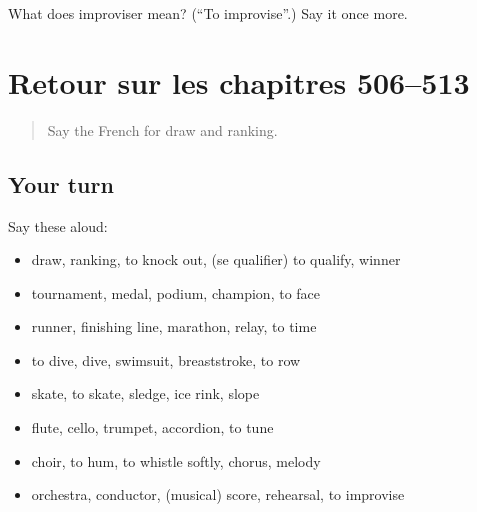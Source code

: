 \begin{tcolorbox}[breakable,colback=teal!4,colframe=teal!35!black,title={Before you move on}]
What does improviser mean? (\textquotedblleft{}To improvise\textquotedblright{}.) Say it once more.
\end{tcolorbox}
\section[(dialogue)]{Retour sur les chapitres 506–513}

\label{lesson:FR-R513-revision-506-513}



\begin{quote}
Say the French for draw and ranking.
\end{quote}

\subsection*{Your turn}
Say these aloud:

\begin{itemize}
\raggedright
  \item draw, ranking, to knock out, (se qualifier) to qualify, winner
  \item tournament, medal, podium, champion, to face
  \item runner, finishing line, marathon, relay, to time
  \item to dive, dive, swimsuit, breaststroke, to row
  \item skate, to skate, sledge, ice rink, slope
  \item flute, cello, trumpet, accordion, to tune
  \item choir, to hum, to whistle softly, chorus, melody
  \item orchestra, conductor, (musical) score, rehearsal, to improvise
\end{itemize}

